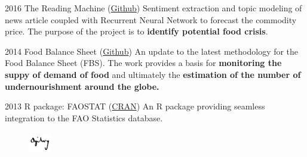 \documentclass{tccv}
\begin{document}
\begin{yearlist}
\item{2016} {The Reading Machine
  (\href{https://github.com/EST-Team-Adam/TheReadingMachine}{Github})}
  {Sentiment extraction and topic modeling of news article coupled
    with Recurrent Neural Network to forecast the commodity price. The
    purpose of the project is to \textbf{identify potential food
      crisis}.}

  
\item{2014} {Food Balance Sheet
  (\href{https://github.com/SWS-Methodology}{Github})} {An update to
  the latest methodology for the Food Balance Sheet (FBS). The work
  provides a basis for \textbf{monitoring the suppy of demand of food}
  and ultimately the \textbf{estimation of the number of
    undernourishment around the globe.}}
  



\item{2013}
     {R package: FAOSTAT
       (\href{http://cran.r-project.org/web/packages/FAOSTAT/index.html}{CRAN})}
     {An R package providing seamless integration to the FAO
       Statistics database.}
  
\end{yearlist}

\vspace{2cm}

\begin{figure}[h!] %
  \centering
  \includegraphics[width=1cm,height=1cm]{../company_icon/ogilvy.jpg}
\end{figure}
\end{document}
